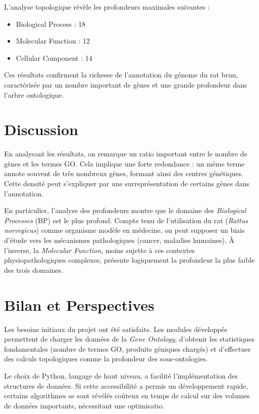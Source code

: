 \documentclass[12pt,a4paper]{article}
\begin{document}
L'analyse topologique révèle les profondeurs maximales suivantes :
\begin{itemize}
    \item Biological Process : 18
    \item Molecular Function : 12
    \item Cellular Component : 14
\end{itemize}

Ces résultats confirment la richesse de l'annotation du génome du rat brun, caractérisée par un nombre important de gènes et une grande profondeur dans l'arbre ontologique.

\section{Discussion}
En analysant les résultats, on remarque un ratio important entre le nombre de gènes et les termes GO. Cela implique une forte redondance : un même terme annote souvent de très nombreux gènes, formant ainsi des centres génétiques. Cette densité peut s'expliquer par une surreprésentation de certains gènes dans l'annotation.

En particulier, l'analyse des profondeurs montre que le domaine des \textit{Biological Processes} (BP) est le plus profond. Compte tenu de l'utilisation du rat (\textit{Rattus norvegicus}) comme organisme modèle en médecine, on peut supposer un biais d'étude vers les mécanismes pathologiques (cancer, maladies humaines). À l'inverse, la \textit{Molecular Function}, moins sujette à ces contextes physiopathologiques complexes, présente logiquement la profondeur la plus faible des trois domaines.

\section{Bilan et Perspectives}

Les besoins initiaux du projet ont été satisfaits. Les modules développés permettent de charger les données de la \textit{Gene Ontology}, d'obtenir les statistiques fondamentales (nombre de termes GO, produits géniques chargés) et d'effectuer des calculs topologiques comme la profondeur des sous-ontologies.

Le choix de Python, langage de haut niveau, a facilité l'implémentation des structures de données. Si cette accessibilité a permis un développement rapide, certains algorithmes se sont révélés coûteux en temps de calcul sur des volumes de données importants, nécessitant une optimisatio.
\end{document}
